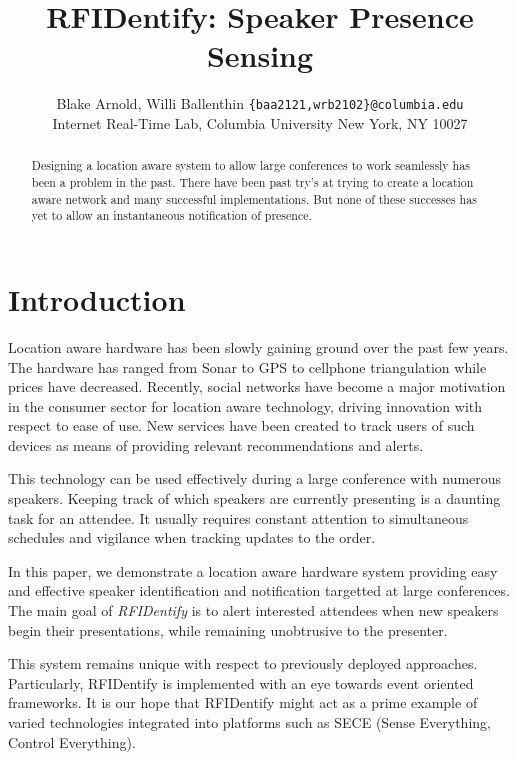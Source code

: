 \documentclass{article}
\title{RFIDentify: Speaker Presence Sensing}
\author{Blake Arnold, Willi Ballenthin
	{\tt\{baa2121,wrb2102\}@columbia.edu}
	
	Internet Real-Time Lab, Columbia University
	New York, NY 10027

	}
\begin{document}
\makecover
\maketitle

\begin{abstract}
	
	Designing a location aware system to allow large conferences to work seamlessly has been a problem in the past. There have been
	 past try's at trying to create a location aware network and many successful implementations. But none of these successes has yet to allow an instantaneous notification of presence.

\end{abstract}


\section{Introduction} 
	
	Location aware hardware has been slowly gaining ground over the past few years. The hardware 
	has ranged from Sonar to GPS to cellphone triangulation while prices have decreased.  
        Recently, social networks have become a major motivation in the consumer sector for location
        aware technology, driving innovation with respect to ease of use.
        New services have been created to track users of such devices as means of providing relevant
        recommendations and alerts.

	This technology can be used effectively during a large conference with numerous speakers.
	Keeping track of which speakers are currently presenting is a daunting task for an attendee. 
        It usually requires constant attention to simultaneous schedules and vigilance when tracking
        updates to the order.

	In this paper, we demonstrate a location aware hardware system providing easy and effective 
        speaker identification and notification targetted at large conferences.
        The main goal of \textit{RFIDentify} is to alert interested  
	attendees when new speakers begin their presentations, while remaining unobtrusive to the 
        presenter.

        This system remains unique with respect to previously deployed approaches.  Particularly,
        RFIDentify is implemented with an eye towards event oriented frameworks.  It is our hope
        that RFIDentify might act as a prime example of varied technologies integrated into platforms
        such as SECE (Sense Everything, Control Everything).
\end{document}
